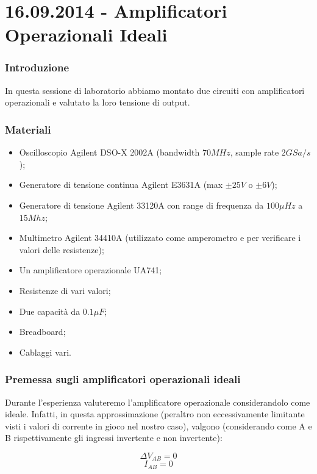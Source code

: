 \documentclass {article}
\begin{document}
\part*{16.09.2014 - Amplificatori Operazionali Ideali}

\section{Introduzione}

In questa sessione di laboratorio abbiamo montato due circuiti con amplificatori operazionali e valutato la loro tensione di output.

\section{Materiali}

\begin{itemize} [noitemsep]
\item Oscilloscopio Agilent DSO-X 2002A (bandwidth $70 MHz$, sample rate $2 GSa/s$);
\item Generatore di tensione continua Agilent E3631A (max $\pm 25 V$ o $\pm 6V$);
\item Generatore di tensione Agilent 33120A con range di frequenza da $100 \mu Hz$ a $15 Mhz$;
\item Multimetro Agilent 34410A (utilizzato come amperometro e per verificare i valori delle resistenze);
\item Un amplificatore operazionale UA741;
\item Resistenze di vari valori;
\item Due capacità da $0.1 \mu F$;
\item Breadboard;
\item Cablaggi vari.
\end{itemize}

\section{Premessa sugli amplificatori operazionali ideali}

Durante l'esperienza valuteremo l'amplificatore operazionale considerandolo come ideale. Infatti, in questa approssimazione (peraltro non eccessivamente limitante visti i valori di corrente in gioco nel nostro caso), valgono (considerando come A e B rispettivamente gli ingressi invertente e non invertente):

\begin{equation}
\Delta V_{AB}=0
\label{eq:regola_V}
\end{equation}
\begin{equation}
I_{AB}=0
\label{eq:regola_I}
\end{equation}
\end{document}
